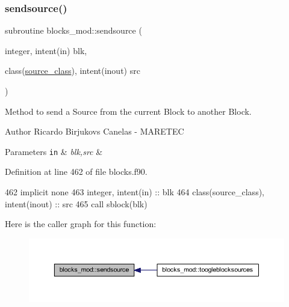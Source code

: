 \subsubsection{\texorpdfstring{sendsource()}{sendsource()}}
{\footnotesize\ttfamily subroutine blocks\+\_\+mod\+::sendsource (\begin{DoxyParamCaption}\item[{integer, intent(in)}]{blk,  }\item[{class(\mbox{\hyperlink{structsources__mod_1_1source__class}{source\+\_\+class}}), intent(inout)}]{src }\end{DoxyParamCaption})\hspace{0.3cm}{\ttfamily [private]}}



Method to send a Source from the current Block to another Block. 

\begin{DoxyAuthor}{Author}
Ricardo Birjukovs Canelas -\/ M\+A\+R\+E\+T\+EC 
\end{DoxyAuthor}

\begin{DoxyParams}[1]{Parameters}
\mbox{\tt in}  & {\em blk,src} & \\
\hline
\end{DoxyParams}


Definition at line 462 of file blocks.\+f90.


\begin{DoxyCode}
462     \textcolor{keywordtype}{implicit none}
463     \textcolor{keywordtype}{integer}, \textcolor{keywordtype}{intent(in)} :: blk
464     \textcolor{keywordtype}{class}(source\_class), \textcolor{keywordtype}{intent(inout)} :: src
465     \textcolor{keyword}{call }sblock(blk)%
\end{DoxyCode}
Here is the caller graph for this function\+:\nopagebreak
\begin{figure}[H]
\begin{center}
\leavevmode
\includegraphics[width=350pt]{namespaceblocks__mod_a1e632738786730731a48d9a432f6ab84_icgraph}
\end{center}
\end{figure}
\mbox{\label{namespaceblocks__mod_a5a9992de40470e417ec8e40e688f6a0e}} 
